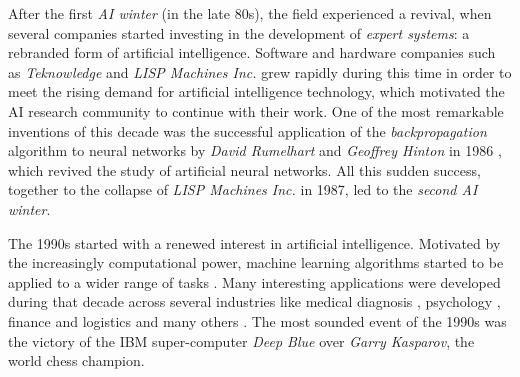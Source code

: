 After the first \textit{AI winter} (in the late 80s), the field experienced a revival, when several companies started investing in the development of \textit{expert systems}: a rebranded form of artificial intelligence. Software and hardware companies such as \textit{Teknowledge} and \textit{LISP Machines Inc.} grew rapidly during this time in order to meet the rising demand for artificial intelligence technology, which motivated the AI research community to continue with their work. One of the most remarkable inventions of this decade was the successful application of the \textit{backpropagation} algorithm to neural networks by \textit{David Rumelhart} and \textit{Geoffrey Hinton} in 1986 \autocite{hinton1986}, which revived the study of artificial neural networks. All this sudden success, together to the collapse of \textit{LISP Machines Inc.} in 1987, led to the \textit{second AI winter}.

The 1990s started with a renewed interest in artificial intelligence. Motivated by the increasingly computational power, machine learning algorithms started to be applied to a wider range of tasks \autocite{Tesauro:1995}. Many interesting applications were developed during that decade across several industries like medical diagnosis \autocite{declaris1991, Klein1991, punch1992, Cinar1999}, psychology \autocite{Dorrer1995, denby1999, Ogawa1999, Perlovsky1999}, finance and logistics \autocite{Lipshutz1991, Benaroch1991, Johnson1991, Falas1994} and many others \autocite{Smithers1993, Yoo1994, Mashaly1994, Koyma1998}. The most sounded event of the 1990s was the victory of the IBM super-computer \textit{Deep Blue} \autocite{Campbell2002} over \textit{Garry Kasparov}, the world chess champion.

